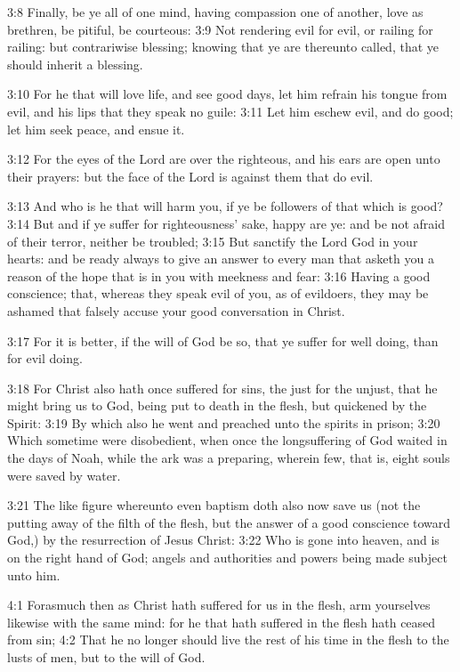 3:8 Finally, be ye all of one mind, having compassion one of another,
love as brethren, be pitiful, be courteous: 3:9 Not rendering evil for
evil, or railing for railing: but contrariwise blessing; knowing that
ye are thereunto called, that ye should inherit a blessing.

3:10 For he that will love life, and see good days, let him refrain
his tongue from evil, and his lips that they speak no guile: 3:11 Let
him eschew evil, and do good; let him seek peace, and ensue it.

3:12 For the eyes of the Lord are over the righteous, and his ears are
open unto their prayers: but the face of the Lord is against them that
do evil.

3:13 And who is he that will harm you, if ye be followers of that
which is good?  3:14 But and if ye suffer for righteousness' sake,
happy are ye: and be not afraid of their terror, neither be troubled;
3:15 But sanctify the Lord God in your hearts: and be ready always to
give an answer to every man that asketh you a reason of the hope that
is in you with meekness and fear: 3:16 Having a good conscience; that,
whereas they speak evil of you, as of evildoers, they may be ashamed
that falsely accuse your good conversation in Christ.

3:17 For it is better, if the will of God be so, that ye suffer for
well doing, than for evil doing.

3:18 For Christ also hath once suffered for sins, the just for the
unjust, that he might bring us to God, being put to death in the
flesh, but quickened by the Spirit: 3:19 By which also he went and
preached unto the spirits in prison; 3:20 Which sometime were
disobedient, when once the longsuffering of God waited in the days of
Noah, while the ark was a preparing, wherein few, that is, eight souls
were saved by water.

3:21 The like figure whereunto even baptism doth also now save us (not
the putting away of the filth of the flesh, but the answer of a good
conscience toward God,) by the resurrection of Jesus Christ: 3:22 Who
is gone into heaven, and is on the right hand of God; angels and
authorities and powers being made subject unto him.

4:1 Forasmuch then as Christ hath suffered for us in the flesh, arm
yourselves likewise with the same mind: for he that hath suffered in
the flesh hath ceased from sin; 4:2 That he no longer should live the
rest of his time in the flesh to the lusts of men, but to the will of
God.

